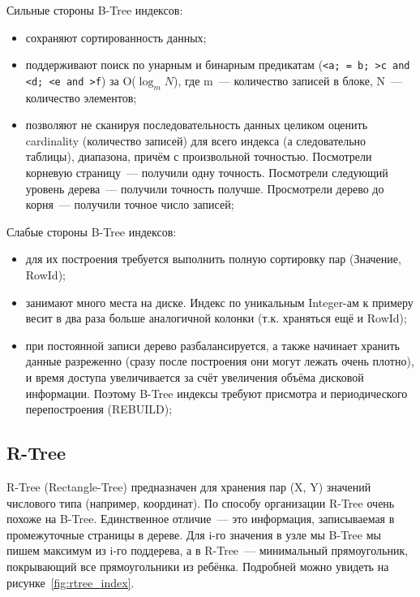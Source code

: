 Сильные стороны B-Tree индексов:

\begin{itemize}
  \item сохраняют сортированность данных;
  \item поддерживают поиск по унарным и бинарным предикатам (\lstinline!<a; = b; >c and <d; <e and >f!) за O($\log_m{N}$), где m~--- количество записей в блоке, N~--- количество элементов;
  \item позволяют не сканируя последовательность данных целиком оценить cardinality (количество записей) для всего индекса (а следовательно таблицы), диапазона, причём с произвольной точностью. Посмотрели корневую страницу~--- получили одну точность. Посмотрели следующий уровень дерева~--- получили точность получше. Просмотрели дерево до корня~--- получили точное число записей;
\end{itemize}

Слабые стороны B-Tree индексов:

\begin{itemize}
  \item для их построения требуется выполнить полную сортировку пар (Значение, RowId);
  \item занимают много места на диске. Индекс по уникальным Integer-ам к примеру весит в два раза больше аналогичной колонки (т.к. храняться ещё и RowId);
  \item при постоянной записи дерево разбалансируется, а также начинает хранить данные разреженно (сразу после построения они могут лежать очень плотно), и время доступа увеличивается за счёт увеличения объёма дисковой информации. Поэтому B-Tree индексы требуют присмотра и периодического перепостроения (REBUILD);
\end{itemize}



\subsection{R-Tree}

R-Tree (Rectangle-Tree) предназначен для хранения пар (X, Y) значений числового типа (например, координат). По способу организации R-Tree очень похоже на B-Tree. Единственное отличие~--- это информация, записываемая в промежуточные страницы в дереве. Для i-го значения в узле мы B-Tree мы пишем максимум из i-го поддерева, а в R-Tree~--- минимальный прямоугольник, покрывающий все прямоугольники из ребёнка. Подробней можно увидеть на рисунке~\ref{fig:rtree_index}.

